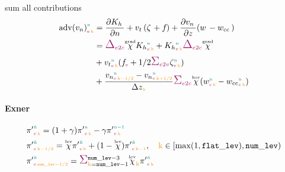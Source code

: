 sum all contributions
\begin{equation}
  \begin{split}
      \advvn{\n}{\e}{\k} & = \pdxn{\kinehori{}{}{}} + \vt{}{}{} (\vortvert{}{}{} + \coriolis{}) + \pdz{\vn{}{}{}} (\w{}{}{} - \wcc{}{}{}) \\
                         & = \Gradn_{\offProv{e2c}} \Cgrad \kinehori{\n}{c}{\k} + \kinehori{\n}{\e}{\k} \Gradn_{\offProv{e2c}} \Cgrad     \\
                         & + \vt{\n}{\e}{\k} (\coriolis{\e} + 1/2 \sum_{\offProv{e2v}} \vortvert{\n}{\v}{\k})                             \\
                         & + \frac{\vn{\n}{\e}{\k-1/2} - \vn{\n}{\e}{\k+1/2}}{\Dz{k}}
      \sum_{\offProv{e2c}} \Whor (\w{\n}{\c}{\k} - \wcc{\n}{\c}{\k})
  \end{split}
\end{equation}

\paragraph{Exner}

\begin{align}
  &\exnerprime{\ntilde}{\c}{\k} = (1 + \WtimeExner) \exnerprime{\n}{\c}{\k} - \WtimeExner \exnerprime{\n-1}{\c}{\k} \\
  &\exnerprime{\ntilde}{\c}{\k-1/2} = \Wlev \exnerprime{\ntilde}{\c}{\k} + (1 - \Wlev) \exnerprime{\ntilde}{\c}{\k-1}, \quad \k \in [\max(1,\nflatlev), \nlev) \\
  &\exnerprime{\ntilde}{\c}{\nlev-1/2} = \sum_{\k=\nlev-1}^{\nlev-3} \Wlev_{\k} \exnerprime{\ntilde}{\c}{\k}
\end{align}


